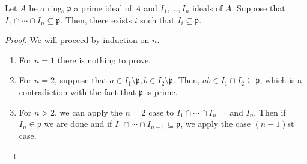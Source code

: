 \begin{exercise}
    Let $A$ be a ring, $\mathfrak{p}$ a prime ideal of $A$ and $I_1, \ldots, I_n$ ideals of $A$.
    Suppose that $I_1 \cap \cdots \cap I_n \subseteq \mathfrak{p}$.
    Then, there exists $i$ such that $I_i \subseteq \mathfrak{p}$.
    \begin{proof}
        We will proceed by induction on $n$.
        \begin{enumerate}
            \item
            For $n=1$ there is nothing to prove.

            \item
            For $n=2$, suppose that
            $a \in I_1 \setminus \mathfrak{p},
            b \in I_2 \setminus \mathfrak{p}$.
            Then, $ab \in I_1 \cap I_2 \subseteq \mathfrak{p}$,
            which is a contradiction with the fact that $\mathfrak{p}$ is prime.

            \item For $n > 2$, we can apply the $n = 2$ case to
            $I_1 \cap \cdots \cap I_{n-1}$ and $I_n$.
            Then if $I_n \in \mathfrak{p}$ we are done and if
            $I_1 \cap \cdots \cap I_{n-1} \subseteq \mathfrak{p}$,
            we apply the case $(n-1)$st case.
        \end{enumerate}

    \end{proof}
\end{exercise}


